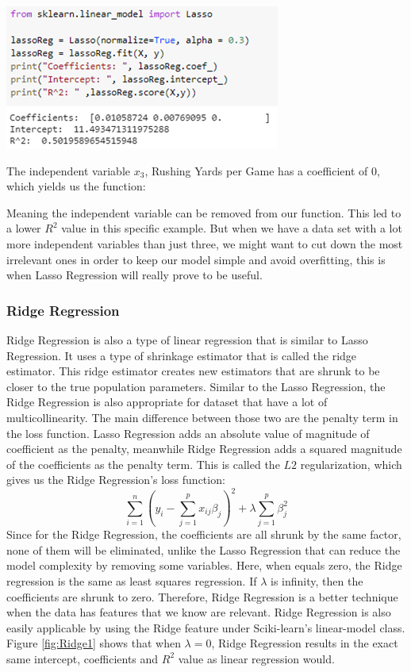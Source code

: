 \documentclass[a4paper,12pt]{report}
\begin{document}
\begin{center}
    \captionsetup{type=figure}
    \includegraphics[width=.9\linewidth]{media/LassoCoeff2.png}
    \label{fig:LassoCoeff2}
\end{center}

The independent variable $x_3$, Rushing Yards per Game has a coefficient of 0, which yields us the function:

Meaning the independent variable  can be removed from our function. This led to a lower $R^2$ value in this specific example. But when we have a data set with a lot more independent variables than just three, we might want to cut down the most irrelevant ones in order to keep our model simple and avoid overfitting, this is when Lasso Regression will really prove to be useful. 

\subsubsection{Ridge Regression}
Ridge Regression is also a type of linear regression that is similar to Lasso Regression. It uses a type of shrinkage estimator that is called the ridge estimator. This ridge estimator creates new estimators that are shrunk to be closer to the true population parameters. Similar to the Lasso Regression, the Ridge Regression is also appropriate for dataset that have a lot of multicollinearity. The main difference between those two are the penalty term in the loss function. Lasso Regression adds an absolute value of magnitude of coefficient as the penalty, meanwhile Ridge Regression adds a squared magnitude of the coefficients as the penalty term. This is called the $L2$ regularization, which gives us the Ridge Regression’s loss function:
$$\sum_{i=1}^n\left(y_i-\sum_{j=1}^px_{ij}\beta_j\right)^2+\lambda\sum_{j=1}^p\beta_j^2$$
Since for the Ridge Regression, the coefficients are all shrunk by the same factor, none of them will be eliminated, unlike the Lasso Regression that can reduce the model complexity by removing some variables. Here, when  equals zero, the Ridge regression is the same as least squares regression. If $\lambda$ is infinity, then the coefficients are shrunk to zero. Therefore, Ridge Regression is a better technique when the data has features that we know are relevant. Ridge Regression is also easily applicable by using the Ridge feature under Sciki-learn’s linear-model class. Figure \ref{fig:Ridge1} shows that when $\lambda=0$, Ridge Regression results in the exact same intercept, coefficients and $R^2$ value as linear regression would.
\end{document}
